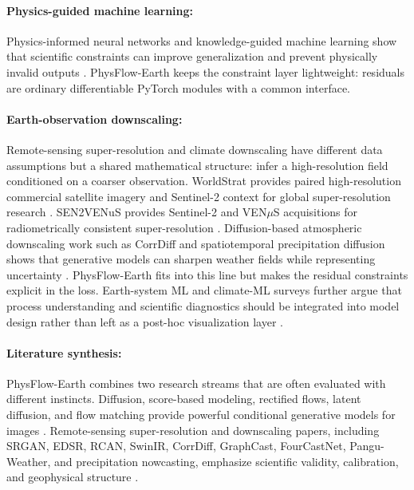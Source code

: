\documentclass{article}
\begin{document}
\paragraph{Physics-guided machine learning:}
Physics-informed neural networks and knowledge-guided machine learning show that scientific constraints can improve generalization and prevent physically invalid outputs \citep{raissi2019physics,karpatne2017theory}. PhysFlow-Earth keeps the constraint layer lightweight: residuals are ordinary differentiable PyTorch modules with a common interface.

\paragraph{Earth-observation downscaling:}
Remote-sensing super-resolution and climate downscaling have different data assumptions but a shared mathematical structure: infer a high-resolution field conditioned on a coarser observation. WorldStrat provides paired high-resolution commercial satellite imagery and Sentinel-2 context for global super-resolution research \citep{cornebise2022worldstrat}. SEN2VENuS provides Sentinel-2 and VEN$\mu$S acquisitions for radiometrically consistent super-resolution \citep{michel2022sen2venus}. Diffusion-based atmospheric downscaling work such as CorrDiff and spatiotemporal precipitation diffusion shows that generative models can sharpen weather fields while representing uncertainty \citep{mardani2023corrdiff,leinonen2023precipitation}. PhysFlow-Earth fits into this line but makes the residual constraints explicit in the loss. Earth-system ML and climate-ML surveys further argue that process understanding and scientific diagnostics should be integrated into model design rather than left as a post-hoc visualization layer \citep{reichstein2019deep,rolnick2019climate}.



\paragraph{Literature synthesis:}
PhysFlow-Earth combines two research streams that are often evaluated with different instincts. Diffusion, score-based modeling, rectified flows, latent diffusion, and flow matching provide powerful conditional generative models for images \citep{ho2020denoising,song2021score,liu2022rectified,lipman2023flow,rombach2022latent,karras2022edm}. Remote-sensing super-resolution and downscaling papers, including SRGAN, EDSR, RCAN, SwinIR, CorrDiff, GraphCast, FourCastNet, Pangu-Weather, and precipitation nowcasting, emphasize scientific validity, calibration, and geophysical structure \citep{ledig2017srgan,lim2017edsr,zhang2018rcan,liang2021swinir,mardani2023corrdiff,lam2023graphcast,pathak2022fourcastnet,bi2023panguweather,ravuri2021skillful}.
\end{document}
